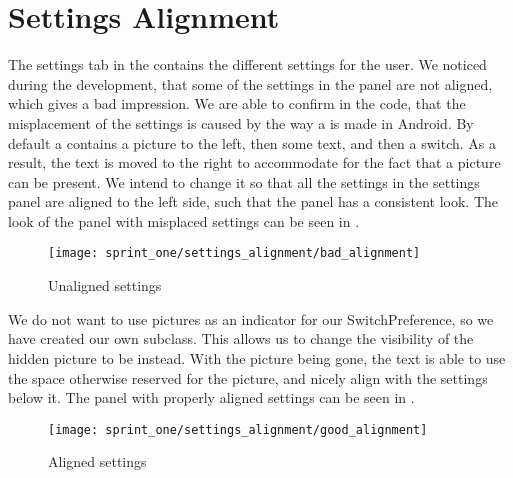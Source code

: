 \section{Settings Alignment}
\label{sec:settings_alignment}

The settings tab in the \launcher contains the different settings for the user. We noticed during the development, that some of the settings in the panel are not aligned, which gives a bad impression. We are able to confirm in the code, that the misplacement of the settings is caused by the way a  is made in Android. By default a  contains a picture to the left, then some text, and then a switch. As a result, the text is moved to the right to accommodate for the fact that a picture can be present. We intend to change it so that all the settings in the settings panel are aligned to the left side, such that the panel has a consistent look. The look of the panel with misplaced settings can be seen in .

\begin{figure}[!htbp]
    \centering
    \texttt{[image: sprint\_one/settings\_alignment/bad\_alignment]}
    \caption{Unaligned settings}
    \label{fig:settings_alignment_bad}
\end{figure}

We do not want to use pictures as an indicator for our SwitchPreference, so we have created our own  subclass. This allows us to change the visibility of the hidden picture to be  instead. With the picture being gone, the text is able to use the space otherwise reserved for the picture, and nicely align with the settings below it. The panel with properly aligned settings can be seen in .

\begin{figure}[!htbp]
    \centering
    \texttt{[image: sprint\_one/settings\_alignment/good\_alignment]}
    \caption{Aligned settings}
    \label{fig:settings_alignment_good}
\end{figure}